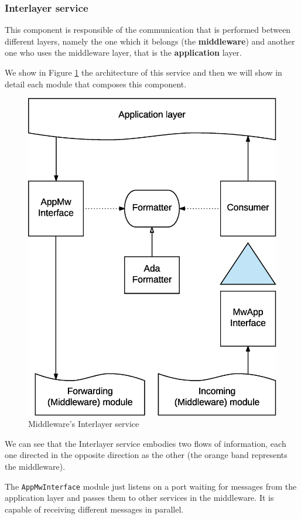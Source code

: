 \subsubsection{Interlayer service}

This component is responsible of the communication that is performed between
different layers, namely the one which it belongs (the \textbf{middleware}) and
another one who uses the middleware layer, that is the \textbf{application}
layer.

We show in Figure \ref{fig:mw-interlayer} the architecture of this service and
then we will show in detail each module that composes this component.

\begin{figure}[H]
  \centering
  \includegraphics[width=.8\columnwidth]{images/solution/mw/int/architect.eps}
  \caption{Middleware's Interlayer service}
  \label{fig:mw-interlayer}
\end{figure}

We can see that the Interlayer service embodies two flows of information, each
one directed in the opposite direction as the other (the orange band represents
the middleware).

The \texttt{AppMwInterface} module just listens on a port waiting for messages
from the application layer and passes them to other services in the middleware.
It is capable of receiving different messages in parallel.

